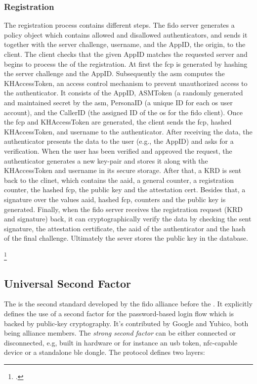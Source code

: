 \subsubsection{Registration}

The registration process contains different steps. The \gls{fido} server generates a policy object which contains allowed and disallowed authenticators, and sends it together with the server challenge, username, and the AppID, the origin, to the client. The client checks that the given AppID matches the requested server and begins to process the of the registration. At first the \gls{fcp} is generated by hashing the server challenge and the AppID. Subsequently the \gls{asm} computes the KHAccessToken, an access control mechanism to prevent unauthorized access to the authenticator. It consists of the AppID, ASMToken (a randomly generated and maintained secret by the \gls{asm}, PersonaID (a unique ID for each \gls{os} user account), and the CallerID (the assigned ID of the \gls{os} for the \gls{fido} client). Once the \gls{fcp} and KHAccessToken are generated, the client sends the \gls{fcp}, hashed KHAccessToken, and username to the authenticator. After receiving the data, the authenticator presents the data to the user (e.g., the AppID) and asks for a verification. When the user has been verified and approved the request, the authenticator generates a new key-pair and stores it along with the KHAccessToken and username in its secure storage. After that, a KRD is sent back to the clinet, which contains the \gls{aaid}, a general counter, a registration counter, the hashed \gls{fcp}, the public key and the attestation cert. Besides that, a signature over the values \gls{aaid}, hashed \gls{fcp}, counters and the public key is generated. Finally, when the \gls{fido} server receives the registration request (KRD and signature) back, it can cryptographically verify the data by checking the sent signature, the attestation certificate, the \gls{aaid} of the authenticator and the hash of the final challenge. Ultimately the sever stores the public key in the database.



\footcites[See][191]{7897543}[See][131]{10.1007/978-3-319-67639-5_11}[See][]{uaf-asm}


\subsection{Universal Second Factor}

The  is the second standard developed by the \gls{fido} alliance before the \wa. It explicitly defines the use of a second factor for the password-based login flow which is backed by public-key cryptography. It's contributed by Google and Yubico, both being alliance members. The \textit{strong second factor} can be either connected or disconnected, e.g, built in hardware or for instance an \gls{usb} token, \gls{nfc}-capable device or a standalone \gls{ble} dongle. The protocol defines two layers:

